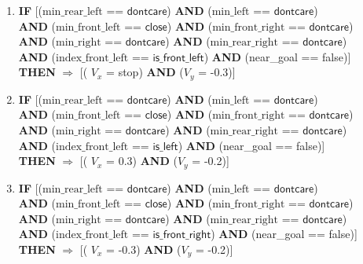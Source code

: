 \begin{enumerate}
	\item \textbf{IF} [($\text{min\_rear\_left}$ == $\textsf{dontcare}$) 
	\textbf{AND} ($\text{min\_left}$ == $\textsf{dontcare}$)\\
	\textbf{AND} ($\text{min\_front\_left}$ == $\textsf{close}$)
	\textbf{AND} ($\text{min\_front\_right}$ == $\textsf{dontcare}$)\\
	\textbf{AND} ($\text{min\_right}$ == $\textsf{dontcare}$) 
	\textbf{AND} ($\text{min\_rear\_right}$ == $\textsf{dontcare}$) \\
	\textbf{AND} ($\text{index\_front\_left}$ == $\textsf{is\_front\_left}$)
	\textbf{AND} (near\_goal == \textsf{false})]\\
	\textbf{THEN} $\Rightarrow$ [( $V_x$ = \textsf{stop}) \textbf{AND} ($V_y$ = \textsf{-0.3})]
	
	\item \textbf{IF} [($\text{min\_rear\_left}$ == $\textsf{dontcare}$) 
	\textbf{AND} ($\text{min\_left}$ == $\textsf{dontcare}$)\\
	\textbf{AND} ($\text{min\_front\_left}$ == $\textsf{close}$)
	\textbf{AND} ($\text{min\_front\_right}$ == $\textsf{dontcare}$)\\
	\textbf{AND} ($\text{min\_right}$ == $\textsf{dontcare}$) 
	\textbf{AND} ($\text{min\_rear\_right}$ == $\textsf{dontcare}$) \\
	\textbf{AND} ($\text{index\_front\_left}$ == $\textsf{is\_left}$)
	\textbf{AND} (near\_goal == \textsf{false})]\\
	\textbf{THEN} $\Rightarrow$ [( $V_x$ = \textsf{0.3}) \textbf{AND} ($V_y$ = \textsf{-0.2})]
	
	\item \textbf{IF} [($\text{min\_rear\_left}$ == $\textsf{dontcare}$) 
	\textbf{AND} ($\text{min\_left}$ == $\textsf{dontcare}$)\\
	\textbf{AND} ($\text{min\_front\_left}$ == $\textsf{close}$)
	\textbf{AND} ($\text{min\_front\_right}$ == $\textsf{dontcare}$)\\
	\textbf{AND} ($\text{min\_right}$ == $\textsf{dontcare}$) 
	\textbf{AND} ($\text{min\_rear\_right}$ == $\textsf{dontcare}$) \\
	\textbf{AND} ($\text{index\_front\_left}$ == $\textsf{is\_front\_right}$)
	\textbf{AND} (near\_goal == \textsf{false})]\\
	\textbf{THEN} $\Rightarrow$ [( $V_x$ = \textsf{-0.3}) \textbf{AND} ($V_y$ = \textsf{-0.2})]
	

\end{enumerate}
